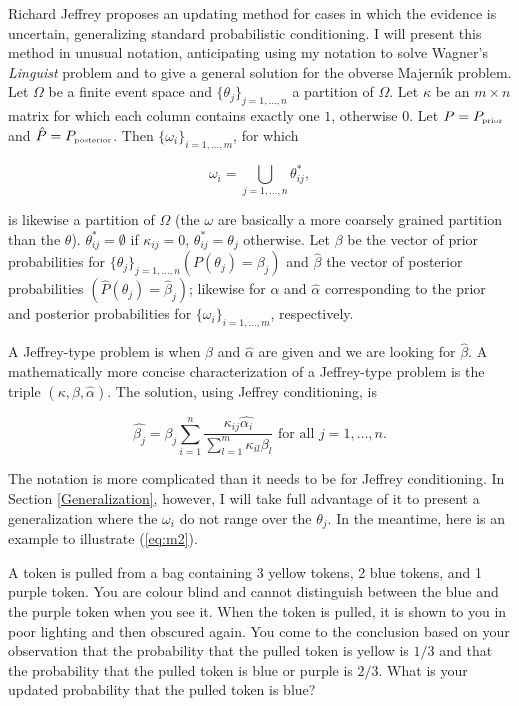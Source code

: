 Richard Jeffrey proposes an updating method for cases in which the
evidence is uncertain, generalizing standard probabilistic
conditioning. I will present this method in unusual notation,
anticipating using my notation to solve Wagner's \emph{Linguist}
problem and to give a general solution for the obverse Majern{\'\i}k
problem. Let $\Omega$ be a finite event space and
$\{\theta_{j}\}_{j=1,\ldots,n}$ a partition of $\Omega$. Let $\kappa$
be an $m\times{}n$ matrix for which each column contains exactly one
$1$, otherwise $0$. Let $P=P_{\mbox{\tiny{prior}}}$ and
$\hat{P}=P_{\mbox{\tiny{posterior}}}$. Then
$\{\omega_{i}\}_{i=1,\ldots,m}$, for which

\begin{equation}
  \label{eq:m1}
  \omega_{i}=\bigcup_{j=1,\dots,n}\theta^{*}_{ij},
\end{equation}

{\noindent}is likewise a partition of $\Omega$ (the $\omega$ are
basically a more coarsely grained partition than the $\theta$).
$\theta^{*}_{ij}=\emptyset$ if $\kappa_{ij}=0$,
$\theta^{*}_{ij}=\theta_{j}$ otherwise. Let $\beta$ be the vector of
prior probabilities for $\{\theta_{j}\}_{j=1,\ldots,n}
(P(\theta_{j})=\beta_{j})$ and $\hat{\beta}$ the vector of posterior
probabilities $(\hat{P}(\theta_{j})=\hat{\beta}_{j})$; likewise for
$\alpha$ and $\hat{\alpha}$ corresponding to the prior and posterior
probabilities for $\{\omega_{i}\}_{i=1,\ldots,m}$, respectively.

A Jeffrey-type problem is when $\beta$ and $\hat{\alpha}$ are given
and we are looking for $\hat{\beta}$. A mathematically more concise
characterization of a Jeffrey-type problem is the triple
$(\kappa,\beta,\hat{\alpha})$. The solution, using Jeffrey
conditioning, is

\begin{equation}
  \label{eq:m2}
  \hat{\beta_{j}}=\beta_{j}\sum_{i=1}^{n}\frac{\kappa_{ij}\hat{\alpha_{i}}}{\sum_{l=1}^{m}\kappa_{il}\beta_{l}}\mbox{ for all }j=1,\ldots,n.
\end{equation}

{\noindent}The notation is more complicated than it needs to be for Jeffrey
conditioning. In Section \ref{Generalization}, however, I will take
full advantage of it to present a generalization where the
$\omega_{i}$ do not range over the $\theta_{j}$. In the meantime, here
is an example to illustrate (\ref{eq:m2}).

\begin{quotex}
  A token is pulled from a bag containing 3 yellow tokens, 2 blue
  tokens, and 1 purple token. You are colour blind and cannot
  distinguish between the blue and the purple token when you see it.
  When the token is pulled, it is shown to you in poor lighting and
  then obscured again. You come to the conclusion based on your
  observation that the probability that the pulled token is yellow is
  $1/3$ and that the probability that the pulled token is blue or
  purple is $2/3$. What is your updated probability that the pulled
  token is blue?
\end{quotex}

